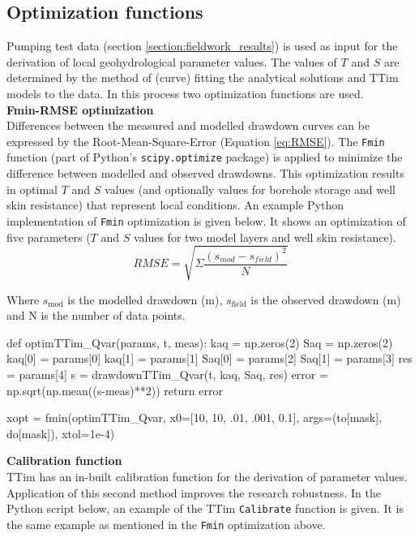 \subsection{Optimization functions}
Pumping test data (section \ref{section:fieldwork_results}) is used as input for the derivation of local geohydrological parameter values. The values of $T$ and $S$ are determined by the method of (curve) fitting the analytical solutions and TTim models to the data. In this process two optimization functions are used. \\

\textbf{Fmin-RMSE optimization}\\
Differences between the measured and modelled drawdown curves can be expressed by the Root-Mean-Square-Error (Equation \ref{eq:RMSE}). The \texttt{Fmin} function (part of Python's \texttt{scipy.optimize} package) is applied to minimize the difference between modelled and observed drawdowns. This optimization results in optimal $T$ and $S$ values (and optionally values for borehole storage and well skin resistance) that represent local conditions. An example Python implementation of \texttt{Fmin} optimization is given below. It shows an optimization of five parameters ($T$ and $S$ values for two model layers and well skin resistance). \\ 


\begin{equation}
\label{eq:RMSE}
 RMSE = \sqrt{\Sigma\frac{(s_{mod}-s_{field})^{2}}{N}}
\end{equation}

Where $s_{\text{mod}}$ is the modelled drawdown (m), $s_{\text{field}}$ is the observed drawdown (m) and N is the number of data points. \\
 
\begin{python}[h!]
def optimTTim_Qvar(params, t, meas):
    kaq = np.zeros(2)
    Saq = np.zeros(2)
    kaq[0] = params[0]             
    kaq[1] = params[1]
    Saq[0] = params[2]
    Saq[1] = params[3]
    res = params[4]
    s = drawdownTTim_Qvar(t, kaq, Saq, res)
    error = np.sqrt(np.mean((s-meas)**2)) 
    return error

xopt = fmin(optimTTim_Qvar, x0=[10, 10, .01, .001, 0.1], args=(to[mask], do[mask]), xtol=1e-4)
\end{python}
\bigskip

\textbf{Calibration function}\\
TTim has an in-built calibration function for the derivation of parameter values. Application of this second method improves the research robustness. In the Python script below, an example of the TTim \texttt{Calibrate} function is given. It is the same example as mentioned in the \texttt{Fmin} optimization above.\\ 

